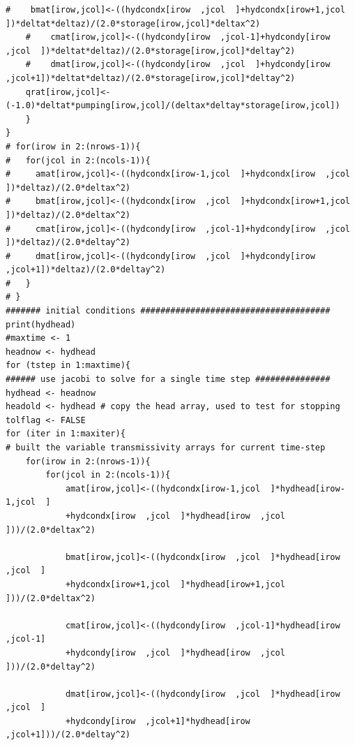 \begin{lstlisting}[caption= Listing for \textbf{R} implementation for unsteady unconfined flow using Jacobi iteration , label=lst:2DUnsteadyUnconfined]
    #    bmat[irow,jcol]<-((hydcondx[irow  ,jcol  ]+hydcondx[irow+1,jcol  ])*deltat*deltaz)/(2.0*storage[irow,jcol]*deltax^2)
    #    cmat[irow,jcol]<-((hydcondy[irow  ,jcol-1]+hydcondy[irow  ,jcol  ])*deltat*deltaz)/(2.0*storage[irow,jcol]*deltay^2)
    #    dmat[irow,jcol]<-((hydcondy[irow  ,jcol  ]+hydcondy[irow  ,jcol+1])*deltat*deltaz)/(2.0*storage[irow,jcol]*deltay^2)
    qrat[irow,jcol]<-(-1.0)*deltat*pumping[irow,jcol]/(deltax*deltay*storage[irow,jcol])
    }
}
# for(irow in 2:(nrows-1)){
#   for(jcol in 2:(ncols-1)){
#     amat[irow,jcol]<-((hydcondx[irow-1,jcol  ]+hydcondx[irow  ,jcol  ])*deltaz)/(2.0*deltax^2)
#     bmat[irow,jcol]<-((hydcondx[irow  ,jcol  ]+hydcondx[irow+1,jcol  ])*deltaz)/(2.0*deltax^2)
#     cmat[irow,jcol]<-((hydcondy[irow  ,jcol-1]+hydcondy[irow  ,jcol  ])*deltaz)/(2.0*deltay^2)
#     dmat[irow,jcol]<-((hydcondy[irow  ,jcol  ]+hydcondy[irow  ,jcol+1])*deltaz)/(2.0*deltay^2)
#   }
# }
####### initial conditions ######################################
print(hydhead)
#maxtime <- 1
headnow <- hydhead
for (tstep in 1:maxtime){
###### use jacobi to solve for a single time step ###############
hydhead <- headnow
headold <- hydhead # copy the head array, used to test for stopping
tolflag <- FALSE
for (iter in 1:maxiter){
# built the variable transmissivity arrays for current time-step
    for(irow in 2:(nrows-1)){
        for(jcol in 2:(ncols-1)){
            amat[irow,jcol]<-((hydcondx[irow-1,jcol  ]*hydhead[irow-1,jcol  ]
            +hydcondx[irow  ,jcol  ]*hydhead[irow  ,jcol  ]))/(2.0*deltax^2)
            
            bmat[irow,jcol]<-((hydcondx[irow  ,jcol  ]*hydhead[irow  ,jcol  ]
            +hydcondx[irow+1,jcol  ]*hydhead[irow+1,jcol  ]))/(2.0*deltax^2)
            
            cmat[irow,jcol]<-((hydcondy[irow  ,jcol-1]*hydhead[irow  ,jcol-1]
            +hydcondy[irow  ,jcol  ]*hydhead[irow  ,jcol  ]))/(2.0*deltay^2)
            
            dmat[irow,jcol]<-((hydcondy[irow  ,jcol  ]*hydhead[irow  ,jcol  ]
            +hydcondy[irow  ,jcol+1]*hydhead[irow  ,jcol+1]))/(2.0*deltay^2)
            

\end{lstlisting}
